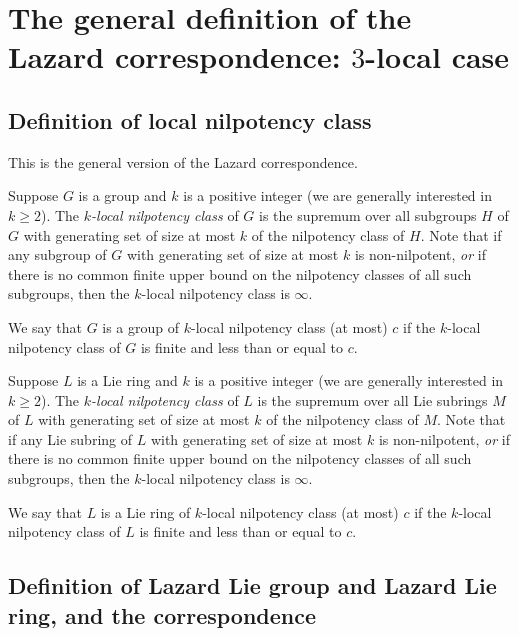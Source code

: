 
\section{The general definition of the Lazard correspondence: $3$-local case}\label{sec:lazard-correspondence}

\subsection{Definition of local nilpotency class}\label{sec:local-nilpotency-class-def}

This is the general version of the Lazard correspondence.

\begin{definer}
  Suppose $G$ is a group and $k$ is a positive integer (we are
  generally interested in $k \ge 2$). The {\em $k$-local nilpotency
    class} of $G$ is the supremum over all subgroups $H$ of $G$ with
  generating set of size at most $k$ of the nilpotency class of
  $H$. Note that if any subgroup of $G$ with generating set of size at
  most $k$ is non-nilpotent, {\em or} if there is no common finite
  upper bound on the nilpotency classes of all such subgroups, then
  the $k$-local nilpotency class is $\infty$.

  We say that $G$ is a group of $k$-local nilpotency class (at most)
  $c$ if the $k$-local nilpotency class of $G$ is finite and less than
  or equal to $c$.
\end{definer}

\begin{definer}
  Suppose $L$ is a Lie ring and $k$ is a positive integer (we are
  generally interested in $k \ge 2$). The {\em $k$-local nilpotency
    class} of $L$ is the supremum over all Lie subrings $M$ of $L$ with
  generating set of size at most $k$ of the nilpotency class of
  $M$. Note that if any Lie subring of $L$ with generating set of size at
  most $k$ is non-nilpotent, {\em or} if there is no common finite
  upper bound on the nilpotency classes of all such subgroups, then
  the $k$-local nilpotency class is $\infty$.

  We say that $L$ is a Lie ring of $k$-local nilpotency class (at most)
  $c$ if the $k$-local nilpotency class of $L$ is finite and less than
  or equal to $c$.
\end{definer}

\subsection{Definition of Lazard Lie group and Lazard Lie ring, and the correspondence}

